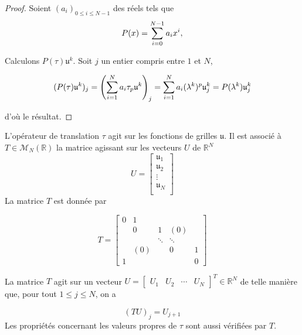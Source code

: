 \begin{proof}
Soient $(a_i)_{0 \leq i \leq N-1}$ des réels tels que 
\begin{equation}
P(x) = \displaystyle\sum\limits_{i=0}^{N-1} a_i x^i,
\end{equation}

Calculons $P(\tau) \mathfrak{u}^k$. Soit $j$ un entier compris entre $1$ et $N$, 

\begin{equation}
(P(\tau) \mathfrak{u}^k)_j = \left( \displaystyle\sum\limits_{i=1}^{N} a_i \tau_ p \mathfrak{u}^k \right)_j = \displaystyle\sum\limits_{i=1}^{N} a_i (\lambda^k)^p \mathfrak{u}^k_j = P(\lambda^k) \mathfrak{u}^k_j
\end{equation}

d'où le résultat.
\end{proof}
L'opérateur de translation $\tau$ agit sur les fonctions de grilles $\mathfrak{u}$. Il est associé à $T \in \mathcal{M}_N \left( \mathbb{R} \right)$ la matrice agissant sur les vecteurs $U$ de $\mathbb{R}^N$
\begin{equation}
U = \begin{bmatrix}
\mathfrak{u}_1\\
\mathfrak{u}_2\\
\vdots\\
\mathfrak{u}_{N}\\
\end{bmatrix}
\end{equation}
La matrice $T$ est donnée par

\begin{equation}
T = \begin{bmatrix}
0 & 1 &   &   &   \\ 
  & 0 & 1 & (0) &   \\ 
  &   & \ddots & \ddots &   \\ 
  & (0) &   & 0 & 1 \\ 
1 &   &   &   & 0
\end{bmatrix} 
\end{equation}

La matrice $T$ agit sur un vecteur $U = \begin{bmatrix}
U_1 & U_2 & \cdots & U_{N} 
\end{bmatrix}^T \in \mathbb{R}^N $ de telle manière que, pour tout $1 \leq j \leq N$, on a 

\begin{equation}
(TU)_j = U_{j+1}
\end{equation}
Les propriétés concernant les valeurs propres de $\tau$ sont aussi vérifiées par $T$.

